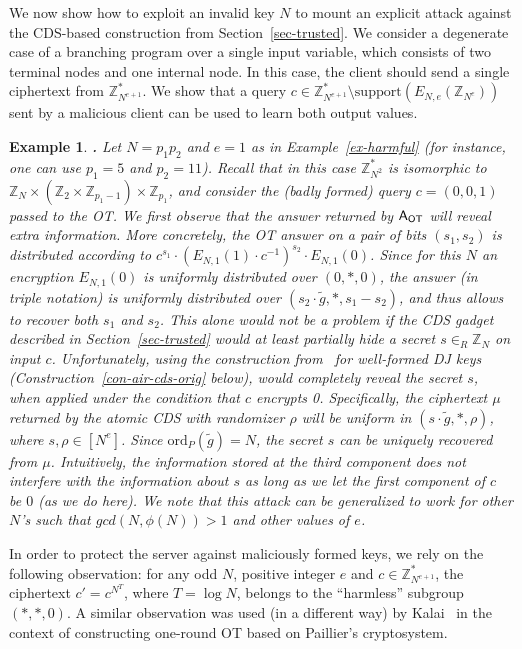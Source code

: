 \documentclass{article}
\newcommand{\order}{{\mathrm{ord}}}
\newcommand{\ansot}{{\sf A_{OT}}}
\newcommand{\encr}[2]{E_{#1}(#2)}
\newcommand{\encdj}{{E}_{N,e}}
\newcommand{\support}{{\mathrm{support}}}
\newcommand{\Z}{{\mathbb{Z}}}
\newtheorem{EXAMPLE}{Example}[section]
\newenvironment{example}{\begin{EXAMPLE} \hspace{-.85em} {\bf .} \rm}%
	{\end{EXAMPLE}}
\newcommand{\ot}{\mbox{OT}\;}
\newcommand{\otns}{\mbox{OT}}
\newcommand{\U}[1]{\mathbb{Z}_{#1}^*}
\begin{document}
We now show how to exploit an invalid key $N$ to mount an explicit
attack against the CDS-based construction from
Section~\ref{sec-trusted}.
We consider a degenerate case of a branching program over a single
input variable, which consists of two terminal nodes and one
internal node. In this case, the client should send a single
ciphertext from $\U{N^{e+1}}$. We show that a query
$c\in\U{N^{e+1}}\setminus\support(\encdj(\Z_{N^e}))$ sent by a
malicious client can be used to learn both output values.
\begin{example}
\label{ex-fullymal-attack} Let $N=p_1p_2$ and $e=1$ as in
Example~\ref{ex-harmful} (for instance, one can use $p_1=5$ and
$p_2=11$). Recall that in this case $\U{N^2}$ is isomorphic to
$\Z_N\times (\Z_2\times\Z_{p_1-1})\times \Z_{p_1}$, and consider
the (badly formed) query $c=(0,0,1)$ passed to the \otns. We first
observe that the answer returned by $\ansot$ will reveal extra
information. More concretely, the OT answer on a pair of bits
$(s_1,s_2)$ is distributed according to
$c^{s_1}\cdot(\encr{N,1}{1}\cdot c^{-1})^{s_2}\cdot \encr{N,1}{0}$.
Since for this $N$ an encryption $\encr{N,1}{0}$ is uniformly
distributed over $(0,*,0)$, the answer (in triple notation) is
uniformly distributed over $(s_2\cdot \tilde{g},*,s_1-s_2)$, and
thus allows to recover both $s_1$ and $s_2$. This alone would not be
a problem if the CDS gadget described in Section~\ref{sec-trusted}
would at least partially hide a secret $s\in_R\Z_N$ on input $c$. Unfortunately, using the
construction from~\cite{AIR01} for well-formed DJ keys (Construction~\ref{con-air-cds-orig} below),
would completely reveal the secret $s$, when applied under
the condition that $c$ encrypts 0. Specifically, the ciphertext
$\mu$ returned by the atomic CDS with randomizer $\rho$ will be
uniform in $(s\cdot \tilde{g},*,\rho)$, where $s,\rho\in[N^e]$.
Since $\order_P(\tilde{g})=N$,  the secret $s$ can be uniquely
recovered from $\mu$. Intuitively, the information stored at the
third component does not interfere with the information about $s$
as long as we let the first component of $c$ be $0$ (as we do
here). We note that this attack can be generalized to work for
other $N$'s such that $gcd(N,\phi(N))>1$ and other values of $e$.
\end{example}

In order to protect the server against maliciously formed keys, we
rely on the following observation: for any odd $N$, positive
integer $e$ and $c\in \U{N^{e+1}}$, the ciphertext $c'=c^{N^T}$,
where $T=\log N$, belongs to the ``harmless'' subgroup $(*,*,0)$. A
similar observation was used (in a different way) by
Kalai~\cite{T05} in the context of constructing one-round OT based
on Paillier's cryptosystem.
\end{document}

